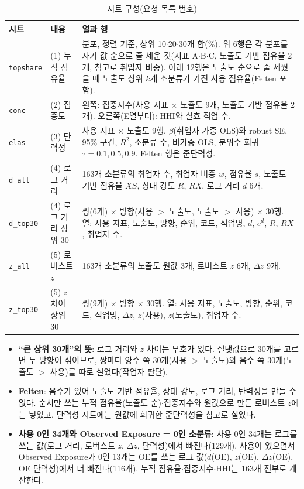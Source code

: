 \documentclass[11pt]{article}
\begin{document}
\begin{small}
\begin{longtable}{L{1.7cm}L{3.0cm}L{10.0cm}}
\caption{시트 구성(요청 목록 번호)}\label{tab:sheets}\\
\toprule
시트 & 내용 & 열과 행 \\
\midrule
\endfirsthead
\texttt{topshare} & (1) 누적 점유율 & 분포, 정렬 기준, 상위 10$\cdot$20$\cdot$30개 합(\%). 위 6행은 각 분포를 자기 값 순으로 줄 세운 것(지표 A$\cdot$B$\cdot$C, 노출도 기반 점유율 2개, 참고로 취업자 비중). 아래 12행은 노출도 순으로 줄 세웠을 때 노출도 상위 $k$개 소분류가 가진 사용 점유율(Felten 포함). \\
\texttt{conc} & (2) 집중도 & 왼쪽: 집중지수(사용 지표 $\times$ 노출도 9개, 노출도 기반 점유율 2개). 오른쪽(E열부터): HHI와 실효 직업 수. \\
\texttt{elas} & (3) 탄력성 & 사용 지표 $\times$ 노출도 9행. $\beta$(취업자 가중 OLS)와 robust SE, 95\% 구간, $R^2$, 소분류 수, 비가중 OLS, 분위수 회귀 $\tau = 0.1, 0.5, 0.9$. Felten 행은 준탄력성. \\
\texttt{d\_all} & (4) 로그 거리 & 163개 소분류의 취업자 수, 취업자 비중 $w$, 점유율 $s$, 노출도 기반 점유율 $XS$, 상대 강도 $R$, $RX$, 로그 거리 $d$ 6개. \\
\texttt{d\_top30} & (4) 로그 거리 상위 30 & 쌍(6개) $\times$ 방향(사용 $>$ 노출도, 노출도 $>$ 사용) $\times$ 30행. 열: 사용 지표, 노출도, 방향, 순위, 코드, 직업명, $d$, $e^d$, $R$, $RX$, 취업자 수. \\
\texttt{z\_all} & (5) 로버스트 $z$ & 163개 소분류의 노출도 원값 3개, 로버스트 $z$ 6개, $\Delta z$ 9개. \\
\texttt{z\_top30} & (5) $z$ 차이 상위 30 & 쌍(9개) $\times$ 방향 $\times$ 30행. 열: 사용 지표, 노출도, 방향, 순위, 코드, 직업명, $\Delta z$, $z$(사용), $z$(노출도), 취업자 수. \\
\bottomrule
\end{longtable}
\end{small}

\begin{itemize}[leftmargin=*]
  \item \textbf{``큰 상위 30개''의 뜻}: 로그 거리와 $z$ 차이는 부호가 있다. 절댓값으로 30개를 고르면 두 방향이 섞이므로, 쌍마다 양수 쪽 30개(사용 $>$ 노출도)와 음수 쪽 30개(노출도 $>$ 사용)를 따로 실었다(작업자 판단).
  \item \textbf{Felten}: 음수가 있어 노출도 기반 점유율, 상대 강도, 로그 거리, 탄력성을 만들 수 없다. 순서만 쓰는 누적 점유율(노출도 순)$\cdot$집중지수와 원값으로 만든 로버스트 $z$에는 넣었고, 탄력성 시트에는 원값에 회귀한 준탄력성을 참고로 실었다.
  \item \textbf{사용 0인 34개와 Observed Exposure = 0인 소분류}: 사용 0인 34개는 로그를 쓰는 값(로그 거리, 로버스트 $z$, $\Delta z$, 탄력성)에서 빠진다(129개). 사용이 있으면서 Observed Exposure가 0인 13개는 OE를 쓰는 로그 값($d$(OE), $z$(OE), $\Delta z$(OE), OE 탄력성)에서 더 빠진다(116개). 누적 점유율$\cdot$집중지수$\cdot$HHI는 163개 전부로 계산한다.
\end{itemize}
\end{document}
